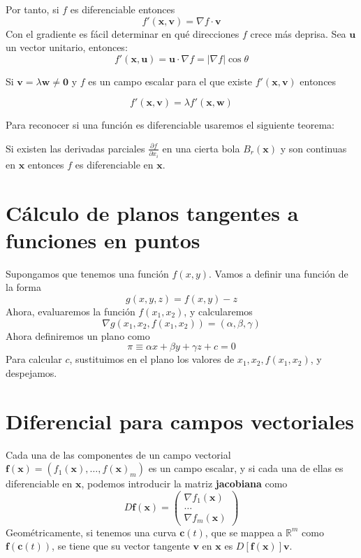 \documentclass{./Calculo.tex}
\begin{document}
Por tanto, si $f$ es diferenciable entonces
$$
f'(\mathbf{x},\mathbf{v})=\nabla f\cdot \mathbf{v}
$$
Con el gradiente es fácil determinar en qué direcciones $f$ crece más deprisa.
Sea $\mathbf{u}$ un vector unitario, entonces:
$$f'(\mathbf{x},\mathbf{u})=\mathbf{u}\cdot \nabla f=|\nabla f|\cos\theta$$
\begin{teorema}
Si $\mathbf{v}=\lambda \mathbf{w}\neq \mathbf{0}$ y $f$ es un campo escalar para el que existe $f'(\mathbf{x},\mathbf{v})$ entonces
 
$$
f'(\mathbf{x},\mathbf{v})=\lambda f'(\mathbf{x},\mathbf{w})
$$
\end{teorema}
Para reconocer si una función es diferenciable usaremos el siguiente teorema:
\begin{teorema}
Si existen las derivadas parciales $\frac{ \partial f }{ \partial x_{i} }$ en una cierta bola $B_{r}(\mathbf{x})$ y son continuas en $\mathbf{x}$ entonces $f$ es diferenciable en $\mathbf{x}$.
\end{teorema}
\section{Cálculo de planos tangentes a funciones en puntos}
Supongamos que tenemos una función $f(x,y)$. Vamos a definir una función de la forma
$$
g(x,y,z)=f(x,y)-z
$$
Ahora, evaluaremos la función $f(x_{1},x_{2})$, y calcularemos
$$
\nabla g(x_{1},x_{2},f(x_{1},x_{2}))= (\alpha,\beta,\gamma)
$$
Ahora definiremos un plano como
$$
\pi \equiv \alpha x+\beta y+\gamma z+c=0
$$
Para calcular $c$, sustituimos en el plano los valores de $x_{1},x_{2},f(x_{1},x_{2})$, y despejamos.
\section{Diferencial para campos vectoriales}
Cada una de las componentes de un campo vectorial $\mathbf{f}(\mathbf{x})=(f_{1}(\mathbf{x}),\dots,f(\mathbf{x})_{m})$ es un campo escalar, y si cada una de ellas es diferenciable en $\mathbf{x}$, podemos introducir la matriz \textbf{jacobiana} como
$$
D\mathbf{f}(\mathbf{x})= \begin{pmatrix}
\nabla f_{1}(\mathbf{x}) \\
\dots \\
\nabla f_{m}(\mathbf{x})
\end{pmatrix}
$$
Geométricamente, si tenemos una curva $\mathbf{c}(t)$, que se mappea a $\mathbb{R}^{m}$ como $\mathbf{f}(\mathbf{c}(t))$, se tiene que su vector tangente $\mathbf{v}$ en $\mathbf{x}$ es $D[\mathbf{f}(\mathbf{x})]\mathbf{v}$.
\end{document}
